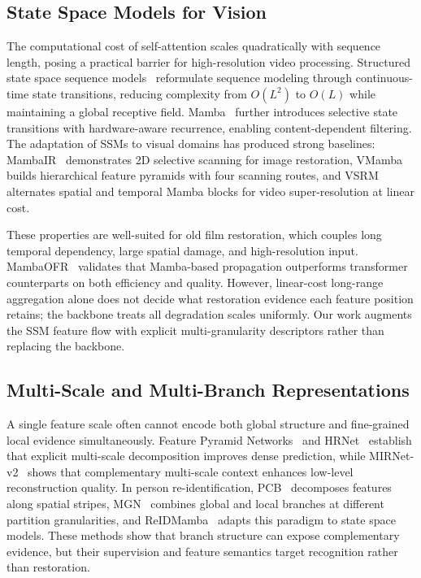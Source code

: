 \subsection{State Space Models for Vision}
\label{subsec:ssm}

The computational cost of self-attention scales quadratically with sequence length, posing a practical barrier for high-resolution video processing. Structured state space sequence models~\cite{gu2022s4} reformulate sequence modeling through continuous-time state transitions, reducing complexity from $O(L^2)$ to $O(L)$ while maintaining a global receptive field. Mamba~\cite{gu2024mamba} further introduces selective state transitions with hardware-aware recurrence, enabling content-dependent filtering. The adaptation of SSMs to visual domains has produced strong baselines: MambaIR~\cite{guo2024mambair} demonstrates 2D selective scanning for image restoration, VMamba~\cite{liu2024vmamba} builds hierarchical feature pyramids with four scanning routes, and VSRM~\cite{tran2025vsrm} alternates spatial and temporal Mamba blocks for video super-resolution at linear cost.

These properties are well-suited for old film restoration, which couples long temporal dependency, large spatial damage, and high-resolution input. MambaOFR~\cite{mao2025mambaofr} validates that Mamba-based propagation outperforms transformer counterparts on both efficiency and quality. However, linear-cost long-range aggregation alone does not decide what restoration evidence each feature position retains; the backbone treats all degradation scales uniformly. Our work augments the SSM feature flow with explicit multi-granularity descriptors rather than replacing the backbone.

\subsection{Multi-Scale and Multi-Branch Representations}
\label{subsec:multigran}

A single feature scale often cannot encode both global structure and fine-grained local evidence simultaneously. Feature Pyramid Networks~\cite{lin2017fpn} and HRNet~\cite{wang2021hrnet} establish that explicit multi-scale decomposition improves dense prediction, while MIRNet-v2~\cite{zamir2022mirnetv2} shows that complementary multi-scale context enhances low-level reconstruction quality. In person re-identification, PCB~\cite{sun2018pcb} decomposes features along spatial stripes, MGN~\cite{wang2018mgn} combines global and local branches at different partition granularities, and ReIDMamba~\cite{gu2025reidmamba} adapts this paradigm to state space models. These methods show that branch structure can expose complementary evidence, but their supervision and feature semantics target recognition rather than restoration.

